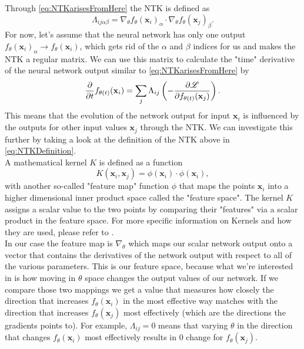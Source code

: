 Through \cref{eq:NTKarisesFromHere} the NTK is defined as 
\begin{equation}\label{eq:NTKDefinition}
	\Lambda_{ij\alpha\beta} = \nabla_\theta f_\theta(\mathbf{x}_i)_\alpha \cdot \nabla_\theta f_\theta(\mathbf{x}_j)_\beta.
\end{equation}
For now, let's assume that the neural network has only one output $f_\theta(\mathbf{x}_i)_\alpha \rightarrow f_\theta(\mathbf{x}_i)$, which gets rid of the $\alpha$ and $\beta$ indices for us and makes the NTK a regular matrix. We can use this matrix to calculate the "time" derivative of the neural network output similar to \cref{eq:NTKarisesFromHere} by 
\begin{equation}\label{eq:NTKExplanation}
	\frac{\partial}{\partial t}f_{\theta(t)}(\mathbf{x}_i) = \sum_j \Lambda_{ij} \left(- \frac{\partial\mathscr{L}}{\partial f_{\theta(t)}(\mathbf{x}_j)}\right).
\end{equation}
This means that the evolution of the network output for input $\mathbf{x}_i$ is influenced by the outputs for other input values $\mathbf{x}_j$ through the NTK. We can investigate this further by taking a look at the definition of the NTK above in \cref{eq:NTKDefinition}. \\
A mathematical kernel $K$ is defined as a function
\begin{equation}
	K(\mathbf{x}_i, \mathbf{x}_j) = \phi(\mathbf{x}_i)\cdot\phi(\mathbf{x}_i),
\end{equation}
with another so-called "feature map" function $\phi$ that maps the points $\mathbf{x}_i$ into a higher dimensional inner product space called the "feature space". The kernel $K$ assigns a scalar value to the two points by comparing their "features" via a scalar product in the feature space. For more specific information on Kernels and how they are used, please refer to \cite{KernelMethod}.\\
In our case the feature map is $\nabla_\theta$ which maps our scalar network output onto a vector that contains the derivatives of the network output with respect to all of the various parameters. This is our feature space, because what we're interested in is how moving in $\theta$ space changes the output values of our network. If we compare those two mappings we get a value that measures how closely the direction that increases $f_\theta(\mathbf{x}_i)$ in the most effective way matches with the direction that increases $f_\theta(\mathbf{x}_j)$ most effectively  (which are the directions the gradients points to). For example, $\Lambda_{ij}=0$ means that varying $\theta$ in the direction that changes $f_\theta(\mathbf{x}_i)$ most effectively results in 0 change for $f_\theta(\mathbf{x}_j)$.\\

